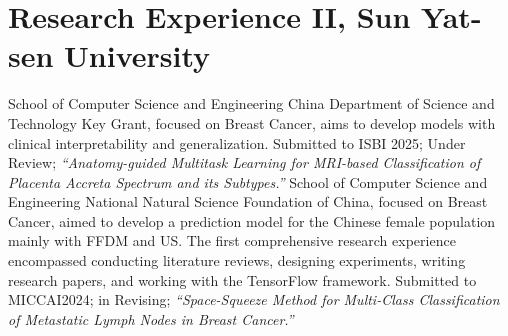 \documentclass[11pt,a4paper, final]{moderncv}
\begin{document}
\section{\textbf{Research Experience II}, Sun Yat-sen University}
	{}{}{School of Computer Science and Engineering}
	{China Department of Science and Technology Key Grant, focused on Breast Cancer, 
	aims to develop models with clinical interpretability and generalization.}
	{Submitted to ISBI 2025; Under Review; 
	\emph{“Anatomy-guided Multitask Learning for MRI-based Classification of Placenta Accreta Spectrum and its Subtypes.”}}
	{}{}{School of Computer Science and Engineering}
	{National Natural Science Foundation of China, focused on Breast Cancer, 
	aimed to develop a prediction model for the Chinese female population mainly with FFDM and US.}
	{The first comprehensive research experience encompassed conducting literature reviews, designing experiments, 
	writing research papers, and working with the TensorFlow framework.}
	{Submitted to MICCAI2024; in Revising; 
	\emph{“Space-Squeeze Method for Multi-Class Classification of Metastatic Lymph Nodes in Breast Cancer.”}}
\end{document}
